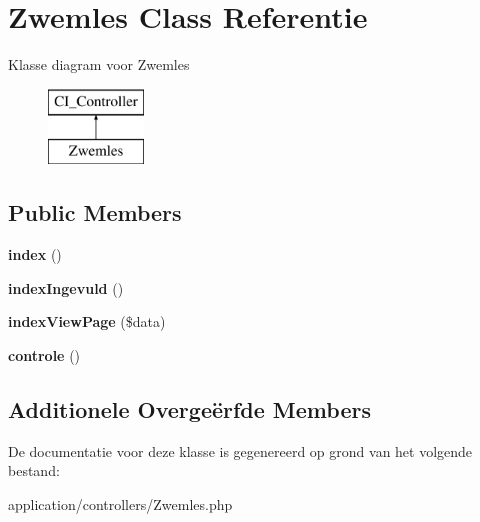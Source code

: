 \hypertarget{class_zwemles}{}\section{Zwemles Class Referentie}
\label{class_zwemles}
Klasse diagram voor Zwemles\begin{figure}[H]
\begin{center}
\leavevmode
\includegraphics[height=2.000000cm]{class_zwemles}
\end{center}
\end{figure}
\subsection*{Public Members}
\begin{DoxyCompactItemize}
\item 
\mbox{\label{class_zwemles_a149eb92716c1084a935e04a8d95f7347}} 
{\bfseries index} ()
\item 
\mbox{\label{class_zwemles_aa3c8a6b0790f3dc784a84aa4bda997e3}} 
{\bfseries index\+Ingevuld} ()
\item 
\mbox{\label{class_zwemles_ad9ddc56c1fcf5e1cd979b040a006afb4}} 
{\bfseries index\+View\+Page} (\$data)
\item 
\mbox{\label{class_zwemles_afe3b8476f0b54225f9d44c2cf0b6bef4}} 
{\bfseries controle} ()
\end{DoxyCompactItemize}
\subsection*{Additionele Overge\"{e}rfde Members}


De documentatie voor deze klasse is gegenereerd op grond van het volgende bestand\+:\begin{DoxyCompactItemize}
\item 
application/controllers/Zwemles.\+php\end{DoxyCompactItemize}
